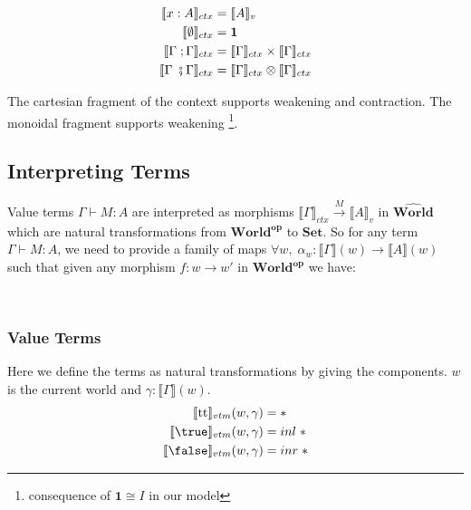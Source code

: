 \documentclass{article}
\newcommand{\ttt}{\textrm{tt}}
\newcommand{\pworld}{\widehat{\mathbf{World}}}
\begin{document}
\begin{align*}
    \llbracket x : A \rrbracket_{ctx} &= \llbracket A \rrbracket_v \\
    \llbracket \emptyset \rrbracket_{ctx} &= \mathbf{1} \\
    \llbracket \Gamma \;; \Gamma \rrbracket_{ctx} &=  \llbracket \Gamma \rrbracket_{ctx} \times \llbracket \Gamma \rrbracket_{ctx}\\
    \llbracket \Gamma \;\fatsemi \Gamma \rrbracket_{ctx} &=  \llbracket \Gamma \rrbracket_{ctx} \otimes \llbracket \Gamma \rrbracket_{ctx} \\
\end{align*}

The cartesian fragment of the context supports weakening and contraction. The monoidal fragment supports weakening
\footnote{consequence of $\mathbf{1} \cong I$ in our model}.


\subsection{Interpreting Terms}
Value terms $\Gamma \vdash M : A$ are interpreted as morphisms 
$\llbracket \Gamma \rrbracket_{ctx} \xrightarrow{M} \llbracket A \rrbracket_{v}$ in $\pworld$ which are natural transformations 
from $\mathbf{World^{op}}$ to $\mathbf{Set}$. So for any term $\Gamma \vdash M : A$, we need to provide a family of maps 
$\forall w ,\; \alpha_w : \llbracket \Gamma \rrbracket(w) \rightarrow \llbracket A \rrbracket(w)$ such that given any morphism 
$f : w \rightarrow w'$ in $\mathbf{World^{op}}$ we have:
\begin{figure}[!ht]
    \centering

\end{figure}\\
\subsubsection{Value Terms}
Here we define the terms as natural transformations by giving the components. $w$ is the current world and 
$\gamma : \llbracket \Gamma \rrbracket(w)$. 
\begin{align*}
    \llbracket  \ttt \rrbracket_{vtm}(w, \gamma) &= *\\
    \llbracket  \true \rrbracket_{vtm}(w,\gamma) &= inl \;*\\
    \llbracket  \false \rrbracket_{vtm}(w,\gamma) &= inr \;*\\
\end{align*}
\end{document}

